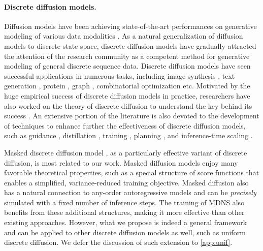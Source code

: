 \documentclass{article}
\theoremstyle{remark}
\begin{document}
\paragraph{Discrete diffusion models.} Diffusion models \cite{sohl2015deep, ho2020denoising,song2021denoising,song2021scorebased} have been achieving state-of-the-art performances on generative modeling of various data modalities \cite{watson2023novo, zhu2025trivialized, esser2024scaling, jin2025pyramidal, zhu2025diffusion, chi2023diffusion, he2024zeroth,rojas2025diffuse, chen2025solving,ren2025driftlite}. As a natural generalization of diffusion models to discrete state space, discrete diffusion models \cite{austin2021structured, campbell2022continuous, chen2023analog, sun2023score, lou2024discrete, gat2024discrete, shaul2025flow} have gradually attracted the attention of the research community as a competent method for generative modeling of general discrete sequence data. Discrete diffusion models have seen successful applications in numerous tasks, including image synthesis \cite{chang2022maskgit, bai2025meissonic, shi2025muddit}, text generation \cite{nie2025large, gong2025scaling, zheng2024a, arriola2025block}, protein \cite{gruver2023protein, alamdari2023protein, hayes2025simulating, wang2024diffusion, chen2025multi, tang2025peptune}, graph \cite{xu2024discrete, li2025layerdag}, combinatorial optimization \cite{sanokowski2024a,sanokowski2025scalable} etc. Motivated by the huge empirical success of discrete diffusion models in practice, researchers have also worked on the theory of discrete diffusion to understand the key behind its success \cite{benton2024denoising, chen2025convergence, ren2025how, feng2025theoretical, kim2025train, ren2025unified, he2025exactly}. An extensive portion of the literature is also devoted to the development of techniques to enhance further the effectiveness of discrete diffusion models, such as guidance \cite{schiff2025simple, guo2024plug, nisonoff2025unlocking, rojas2025theory}, distillation \cite{zhu2025di, deschenaux2025beyond}, training \cite{zhang2025target, liu2025discrete}, planning \cite{park2025jump, liu2025think}, and inference-time scaling \cite{wang2025remasking,tang2025tr2}.

Masked discrete diffusion model \cite{sahoo2024simple, ou2025your, shi2024simplified, zheng2025masked}, as a particularly effective variant of discrete diffusion, is most related to our work. Masked diffusion models enjoy many favorable theoretical properties, such as a special structure of score functions that enables a simplified, variance-reduced training objective. Masked diffusion also has a natural connection to any-order autoregressive models and can be \textit{precisely} simulated with a fixed number of inference steps. The training of MDNS also benefits from these additional structures, making it more effective than other existing approaches. However, what we propose is indeed a general framework and can be applied to other discrete diffusion models as well, such as uniform discrete diffusion. We defer the discussion of such extension to \cref{app:unif}. 
\end{document}
